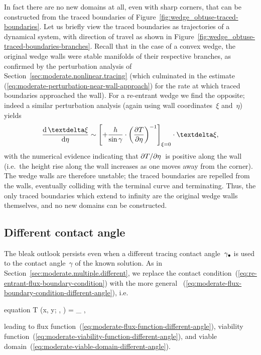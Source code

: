 In fact there are no new domains at all,
even with sharp corners,
that can be constructed from the traced boundaries
of Figure~\ref{fig:wedge_obtuse-traced-boundaries}.
Let us briefly view the traced boundaries
as trajectories of a dynamical system,
with direction of travel as shown in
Figure~\ref{fig:wedge_obtuse-traced-boundaries-branches}.
Recall that in the case of a convex wedge,
the original wedge walls were stable manifolds of their respective branches,
as confirmed by the perturbation analysis
of Section~\ref{sec:moderate.nonlinear.tracing}
(which culminated in the estimate~%
  (\ref{eq:moderate-perturbation-near-wall-approach})
for the rate at which traced boundaries approached the wall).
For a re-entrant wedge we find the opposite;
indeed a similar perturbation analysis
(again using wall coordinates~$\xi$ and~$\eta$)
yields
\begin{equation}
  \tder{\vd\xi}{\eta} \asy
    \squarebr*{
      +\frac{h}{\sin\gamma} \cdot \roundbr*{\pder{T}{\eta}}^{-1}
    }_{\xi=0}
      \cdot \vd\xi,
  \label{eq:re-entrant-perturbation-near-wall-repulsion}
\end{equation}
with the numerical evidence indicating that
$\mathop{}\!\partial T / {\mathop{}\!\partial\eta}$~is positive along the wall
(i.e.~the height rise along the wall increases
as one moves away from the corner).
The wedge walls are therefore unstable;
the traced boundaries are repelled from the walls,
eventually colliding with the terminal curve and terminating.
Thus, the only traced boundaries which extend to infinity
are the original wedge walls themselves,
and no new domains can be constructed.

\subsection{Different contact angle}
\label{sec:re-entrant.rounding.different}

The bleak outlook persists
even when a different tracing contact angle~$\gamma_\bullet$ is used
to the contact angle~$\gamma$ of the known solution.
As in Section~\ref{sec:moderate.multiple.different},
we replace the contact condition~(\ref{eq:re-entrant-flux-boundary-condition})
with the more general~%
  (\ref{eq:moderate-flux-boundary-condition-different-angle}),
i.e.
\begin{important}{equation}
  \normalvec \dotp \del T (x, y; \alpha, \gamma) =
    \cos\gamma_\tr
    ,
  \label{eq:re-entrant-flux-boundary-condition-different-angle}
\end{important}
leading to flux function~(\ref{eq:moderate-flux-function-different-angle}),
viability function~(\ref{eq:moderate-viability-function-different-angle}),
and viable domain~(\ref{eq:moderate-viable-domain-different-angle}).

